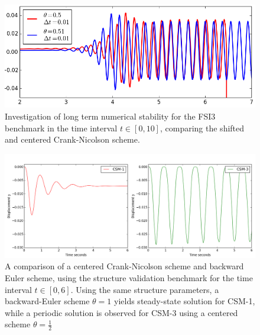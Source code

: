 \begin{figure}[h!]
 	\centering
    \includegraphics[scale=0.6]{./Fig/besttheta.png}
      \caption{Investigation of long term numerical stability for the FSI3 benchmark in the time interval $t \in [0, 10]$,  comparing the shifted and centered Crank-Nicolson scheme. }
\label{fig:cncomp2}
\end{figure}

\newpage

\begin{figure}[h!]
 	\centering
    \includegraphics[scale=0.4]{./Fig/thetacompare.png}
      \caption{A comparison of a centered Crank-Nicolson scheme and backward Euler scheme, using the structure validation benchmark for the time interval  $t \in [0, 6]$. Using the same structure parameters, a backward-Euler scheme $\theta = 1$ yields steady-state solution for CSM-1, while a periodic solution is observed for CSM-3 using a centered scheme $\theta = \frac{1}{2}$  }
\label{fig:csm1scm3}
\end{figure}


\newpage
